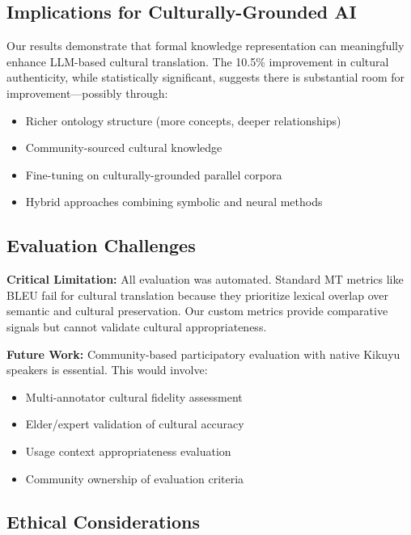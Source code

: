 \documentclass[11pt,twocolumn]{article}
\begin{document}
\subsection{Implications for Culturally-Grounded AI}

Our results demonstrate that formal knowledge representation can meaningfully enhance LLM-based cultural translation. The 10.5\% improvement in cultural authenticity, while statistically significant, suggests there is substantial room for improvement---possibly through:

\begin{itemize}
    \item Richer ontology structure (more concepts, deeper relationships)
    \item Community-sourced cultural knowledge
    \item Fine-tuning on culturally-grounded parallel corpora
    \item Hybrid approaches combining symbolic and neural methods
\end{itemize}

\subsection{Evaluation Challenges}
\label{sec:limitations}

\textbf{Critical Limitation:} All evaluation was automated. Standard MT metrics like BLEU fail for cultural translation because they prioritize lexical overlap over semantic and cultural preservation. Our custom metrics provide comparative signals but cannot validate cultural appropriateness.

\textbf{Future Work:} Community-based participatory evaluation with native Kikuyu speakers is essential. This would involve:
\begin{itemize}
    \item Multi-annotator cultural fidelity assessment
    \item Elder/expert validation of cultural accuracy
    \item Usage context appropriateness evaluation
    \item Community ownership of evaluation criteria
\end{itemize}

\subsection{Ethical Considerations}
\end{document}
